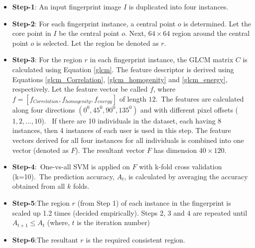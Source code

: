\begin{itemize}
	\item \textbf{Step-1}: An input fingerprint image $I$ is duplicated into
	      four instances.
	\item \textbf{Step-2}: For each fingerprint instance, a central point  $o$
	      is determined. Let the core point in $I$ be the central point $o$.
	      Next, $64\times 64 $  region around the central point $o$ is selected.
	      Let the region be denoted as $r$.
	\item \textbf{Step-3}: For the region $r$ in each fingerprint instance, the
	      GLCM matrix $C$ is calculated using Equation \ref{glcm}. The feature
	      descriptor is derived using Equations \ref{glcm_Correlation},
	      \ref{glcm_homogenity} and \ref{glcm_energy}, respectively. Let the
	      feature vector be called $f$, where $f=[f_{Correlation},f_{homogenity},f_{energy}]$ of
	      length $12$.~The features are calculated along four directions
	      $(0^{0}, 45^{0}, 90^{0}, 135^{0})$ and with different pixel offsets
	      ($1,2,\ldots,10$). ~If there are 10 individuals in the dataset, each
	      having 8 instances, then 4 instances of each user is used in this
	      step. The feature vectors derived for all four instances for all
	      individuals is combined into one vector (denoted as $F$). The
	      resultant vector $F$ has dimension $40 \times 120$.
	\item \textbf{Step-4}:~One-vs-all SVM is applied on $F$ with k-fold
	      cross validation (k=10).~The prediction accuracy, $A_{t}$, is calculated
	      by averaging the accuracy obtained from all $k$ folds.
	\item \textbf{Step-5}:The region $r$ (from Step 1) of each instance in the fingerprint
	      is scaled up 1.2 times (decided empirically). Steps $2$, $3$ and $4$
	      are repeated until $A_{t+1} \leq A_{t} $ (where, $t$ is the
	      iteration number) %
	\item \textbf{Step-6}:The resultant $r$ is the required consistent region.
\end{itemize}

